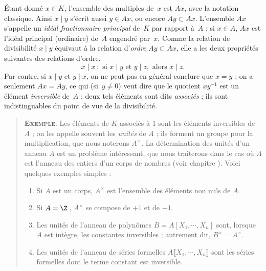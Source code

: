 \documentclass[11pt, %
  title in boldface,
  theorem in new line,
  theorem numbering = section,
  number theorems separately,
  simple name,
]{beaulivre}
\begin{document}
    Étant donné \( x \in K \), l'ensemble des multiples de~\( x \) est \( Ax \), avec la notation classique. Ainsi \( x \mid y \) s'écrit aussi \( y \in Ax \), ou encore \( Ay \subset Ax \). L'ensemble \( Ax \) s'appelle un \emph{idéal fractionnaire principal} de~\( K \) par rapport à~\( A \) ; si \( x \in A \), \( Ax \) est l'idéal principal (ordinaire) de~\( A \) engendré par~\( x \). Comme la relation de divisibilité \( x \mid y \) équivaut à la relation d'\emph{ordre} \( Ay \subset Ax \), elle a les deux propriétés suivantes des relations d'ordre.
    \begin{equation}
        x \mid x  ~;
        \text{ si } x \mid y \text{ et } y \mid z, \text{ alors } x \mid z.
    \end{equation}
    Par contre, si \( x \mid y \) et \( y \mid x \), on ne peut pas en général conclure que \( x = y \) ; on a seulement \( Ax = Ay \), ce qui (si~\( y \neq 0 \)) veut dire que le quotient \( x y^{-1} \) est un élément \emph{inversible} de~\( A \) ; deux tels éléments sont dits \emph{associés} ; ils sont indistinguables du point de vue de la divisibilité.

    \begin{quote}
        \textsc{\textbf{Exemple}}.
        Les éléments de \( K \) associés à \( 1 \) sont les éléments inversibles de \( A \) ; on les appelle souvent les \emph{unités} de \( A \) ; ils forment un groupe pour la multiplication, que nous noterons \( A^\times \). La détermination des unités d'un anneau \( A \) est un problème intéressant, que nous traiterons dans le cas où \( A \) est l'anneau des entiers d'un corps de nombres (voir chapitre ). Voici quelques exemples simples :
        \begin{enumerate}
            \item Si \( A \) est un corps, \( A^\times \) est l'ensemble des éléments non nuls de \( A \).
            \item Si \( A = \Z \)\,, \( A^\times \) se compose de \( +1 \) et de \( -1 \).
            \item Les unités de l'anneau de polynômes \( B = A[X_1, \cdots, X_n] \) sont, lorsque \( A \) est intègre, les constantes inversibles ; autrement dit, \( B^\times = A^\times \).
            \item Les unités de l'anneau de séries formelles \( A\lBrack X_1, \cdots, X_n \rBrack \) sont les séries formelles dont le terme constant est inversible.
        \end{enumerate}
    \end{quote}
\end{document}

